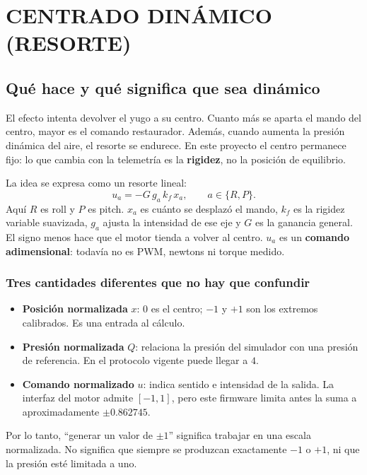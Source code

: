 \section{CENTRADO DINÁMICO (RESORTE)}

\subsection{Qué hace y qué significa que sea dinámico}
El efecto intenta devolver el yugo a su centro. Cuanto más se aparta el mando del centro, mayor es el comando restaurador. Además, cuando aumenta la presión dinámica del aire, el resorte se endurece. En este proyecto el centro permanece fijo: lo que cambia con la telemetría es la \textbf{rigidez}, no la posición de equilibrio.

La idea se expresa como un resorte lineal:
\begin{equation}
u_a=-G\,g_a\,k_f\,x_a,\qquad a\in\{R,P\}.
\label{eq:resorte}
\end{equation}
Aquí $R$ es roll y $P$ es pitch. $x_a$ es cuánto se desplazó el mando, $k_f$ es la rigidez variable suavizada, $g_a$ ajusta la intensidad de ese eje y $G$ es la ganancia general. El signo menos hace que el motor tienda a volver al centro. $u_a$ es un \textbf{comando adimensional}: todavía no es PWM, newtons ni torque medido.

\subsubsection{Tres cantidades diferentes que no hay que confundir}
\begin{itemize}
\item \textbf{Posición normalizada} $x$: $0$ es el centro; $-1$ y $+1$ son los extremos calibrados. Es una entrada al cálculo.
\item \textbf{Presión normalizada} $Q$: relaciona la presión del simulador con una presión de referencia. En el protocolo vigente puede llegar a $4$.
\item \textbf{Comando normalizado} $u$: indica sentido e intensidad de la salida. La interfaz del motor admite $[-1,1]$, pero este firmware limita antes la suma a aproximadamente $\pm0.862745$.
\end{itemize}
Por lo tanto, ``generar un valor de $\pm1$'' significa trabajar en una escala normalizada. No significa que siempre se produzcan exactamente $-1$ o $+1$, ni que la presión esté limitada a uno.

